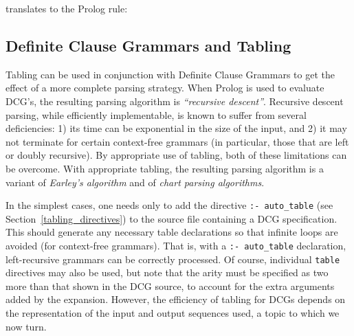 
\noindent
translates to the Prolog rule:


\subsection{Definite Clause Grammars and Tabling}
\label{sec:dcg_tabling}

Tabling can be used in conjunction with Definite Clause Grammars to get the
effect of a more complete parsing strategy.  When Prolog is used to evaluate
DCG's, the resulting parsing algorithm is {\em ``recursive descent''}.
Recursive descent parsing, while efficiently implementable, is known to
suffer from several deficiencies:  1) its time can be exponential in the size
of the input, and 2) it may not terminate for certain context-free grammars (in
particular, those that are left or doubly recursive).  By appropriate use of
tabling, both of these limitations can be overcome.  With appropriate tabling,
the resulting parsing algorithm is a variant of {\em Earley's algorithm\/} and
of {\em chart parsing algorithms}.

In the simplest cases, one needs only to add the directive {\tt :-
auto\_table} (see Section~\ref{tabling_directives}) to the source file
containing a DCG specification.  This should generate any necessary
table declarations so that infinite loops are avoided (for
context-free grammars).  That is, with a {\tt :- auto\_table}
declaration, left-recursive grammars can be correctly processed.  Of
course, individual {\tt table} directives may also be used, but note
that the arity must be specified as two more than that shown in the
DCG source, to account for the extra arguments added by the expansion.
However, the efficiency of tabling for DCGs depends on the
representation of the input and output sequences used, a topic to
which we now turn.


